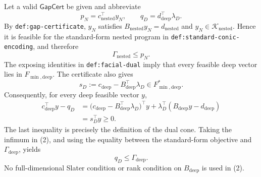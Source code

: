 Let a valid \(\mathsf{GapCert}\) be given and abbreviate
\[
 p_N=c_{\mathrm{nested}}^{\top}y_N,
 \qquad
 q_D=d_{\mathrm{deep}}^{\top}\lambda_D.
\]
By \texttt{def:gap-certificate}, \(y_N\) satisfies
\(B_{\mathrm{nested}}y_N=d_{\mathrm{nested}}\) and
\(y_N\in\mathcal K_{\mathrm{nested}}\).  Hence it is feasible for the
standard-form nested program in \texttt{def:standard-conic-encoding}, and
therefore
\[
 \Gamma_{\mathrm{nested}}\le p_N. \tag{1}
\]
The exposing identities in \texttt{def:facial-dual} imply that every feasible
deep vector lies in \(F_{\min,\mathrm{deep}}\).  The certificate also gives
\[
 s_D:=c_{\mathrm{deep}}-B_{\mathrm{deep}}^{\top}\lambda_D
 \in F_{\min,\mathrm{deep}}^*.
\]
Consequently, for every deep feasible vector \(y\),
\[
 \begin{aligned}
 c_{\mathrm{deep}}^{\top}y-q_D
 &=\bigl(c_{\mathrm{deep}}-B_{\mathrm{deep}}^{\top}\lambda_D\bigr)^{\top}y
   +\lambda_D^{\top}(B_{\mathrm{deep}}y-d_{\mathrm{deep}})\\
 &=s_D^{\top}y\ge0.
 \end{aligned} \tag{2}
\]
The last inequality is precisely the definition of the dual cone.  Taking the
infimum in (2), and using the equality between the standard-form objective and
\(\Gamma_{\mathrm{deep}}\), yields
\[
 q_D\le\Gamma_{\mathrm{deep}}. \tag{3}
\]
No full-dimensional Slater condition or rank condition on
\(B_{\mathrm{deep}}\) is used in (2).

